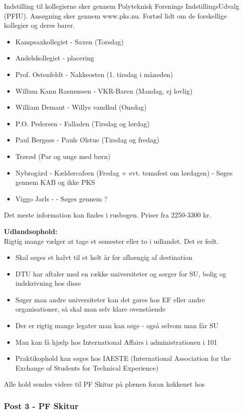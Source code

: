 Indstilling til kollegierne sker gennem Polyteknisk Forenings IndstillingsUdvalg (PFIU). Ansøgning sker gennem www.pks.nu. Fortæl lidt om de forskellige kollegier og deres barer.
\begin{itemize}
 \item Kampsaxkollegiet - Saxen (Torsdag)
 \item Andelskollegiet - placering
 \item Prof. Ostenfeldt - Nakkeosten (1. tirsdag i måneden)
 \item Willum Kann Rasmussen - VKR-Baren (Mandag, ej lovlig)
 \item William Demant - Willys vandhul (Onsdag)
 \item P.O. Pedersen - Falladen (Tirsdag og lørdag)
 \item Paul Bergsøe - Pauls Ølstue (Tirsdag og fredag)
 \item Trørød (Par og unge med børn)
 \item Nybrogård - Kældercafeen (Fredag + evt. temafest om lørdagen) - Søges gennem KAB og ikke PKS
 \item Viggo Jarls -  - Søges gennem ?
\end{itemize}
Det meste information kan findes i rusbogen. Priser fra 2250-3300 kr.

\textbf{Udlandsophold:}\\
Rigtig mange vælger at tage et semester eller to i udlandet. Det er fedt.
\begin{itemize}
\item Skal søges et halvt til et helt år før afhængig af destination
\item DTU har aftaler med en række universiteter og sørger for SU, bolig og indskrivning hos disse
\item Søger man andre universiteter kan det gøres hos EF eller andre organisationer, så skal man selv klare ovenstående
\item Der er rigtig mange legater man kan søge - også selvom man får SU
\item Man kan få hjælp hos International Affairs i administrationen i 101
\item Praktikophold kan søges hos IAESTE (International Association for the Exchange of Students for Technical Experience)
\end{itemize}


Alle hold sendes videre til PF Skitur på plænen foran køkkenet hos \Buddha


\subsubsection*{\textbf{Post 3 - PF Skitur}}
